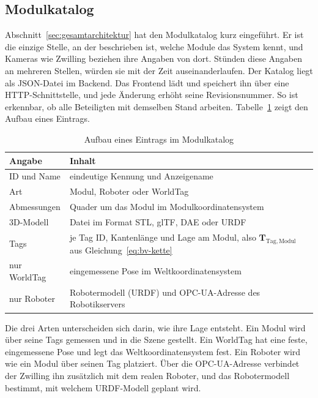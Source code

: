 \subsection{Modulkatalog}
\label{subsec:dz-katalog}
Abschnitt~\ref{sec:gesamtarchitektur} hat den Modulkatalog kurz eingeführt. Er ist die einzige Stelle, an der beschrieben ist, welche Module das System kennt, und Kameras wie Zwilling beziehen ihre Angaben von dort. Stünden diese Angaben an mehreren Stellen, würden sie mit der Zeit auseinanderlaufen. Der Katalog liegt als JSON-Datei im Backend. Das Frontend lädt und speichert ihn über eine HTTP-Schnittstelle, und jede Änderung erhöht seine Revisionsnummer. So ist erkennbar, ob alle Beteiligten mit demselben Stand arbeiten. Tabelle~\ref{tab:dz-katalog} zeigt den Aufbau eines Eintrags.

\begin{table}[htbp]
    \centering
    \caption{Aufbau eines Eintrags im Modulkatalog}
    \label{tab:dz-katalog}
    \begin{tabularx}{\textwidth}{lX}
        \toprule
        \textbf{Angabe} & \textbf{Inhalt} \\
        \midrule
        ID und Name    & eindeutige Kennung und Anzeigename \\
        Art            & Modul, Roboter oder WorldTag \\
        Abmessungen    & Quader um das Modul im Modulkoordinatensystem \\
        3D-Modell      & Datei im Format STL, glTF, DAE oder URDF \\
        Tags           & je Tag ID, Kantenlänge und Lage am Modul, also $\mathbf{T}_{\mathrm{Tag,Modul}}$ aus Gleichung~\eqref{eq:bv-kette} \\
        nur WorldTag   & eingemessene Pose im Weltkoordinatensystem \\
        nur Roboter    & Robotermodell (URDF) und OPC-UA-Adresse des Robotikservers \\
        \bottomrule
    \end{tabularx}
\end{table}

Die drei Arten unterscheiden sich darin, wie ihre Lage entsteht. Ein Modul wird über seine Tags gemessen und in die Szene gestellt. Ein WorldTag hat eine feste, eingemessene Pose und legt das Weltkoordinatensystem fest. Ein Roboter wird wie ein Modul über seinen Tag platziert. Über die OPC-UA-Adresse verbindet der Zwilling ihn zusätzlich mit dem realen Roboter, und das Robotermodell bestimmt, mit welchem URDF-Modell geplant wird.

